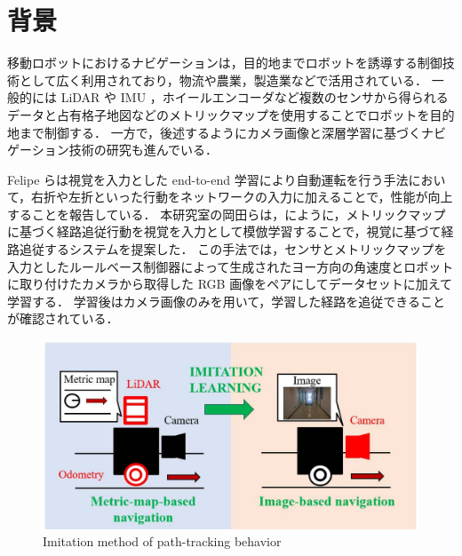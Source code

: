 
\section{背景}
移動ロボットにおけるナビゲーションは，目的地までロボットを誘導する制御技術として広く利用されており，物流や農業，製造業などで活用されている．
一般的には LiDAR や IMU ，ホイールエンコーダなど複数のセンサから得られるデータと占有格子地図などのメトリックマップを使用することでロボットを目的地まで制御する．
一方で，後述するようにカメラ画像と深層学習に基づくナビゲーション技術の研究も進んでいる．

Felipe ら\cite{codevilla2018endtoend}は視覚を入力とした end-to-end 学習により自動運転を行う手法において，右折や左折といった行動をネットワークの入力に加えることで，性能が向上することを報告している．
本研究室の岡田ら\cite{okada2020}\cite{okada2021}は，にように，メトリックマップに基づく経路追従行動を視覚を入力として模倣学習することで，視覚に基づて経路追従するシステムを提案した．
この手法では，センサとメトリックマップを入力としたルールベース制御器によって生成されたヨー方向の角速度とロボットに取り付けたカメラから取得した RGB 画像をペアにしてデータセットに加えて学習する．
学習後はカメラ画像のみを用いて，学習した経路を追従できることが確認されている．
\begin{figure}[h]
     \centering
     \includegraphics[width=120mm]{images/pdf/ishiguro/system.pdf}
     \caption{Imitation method of path-tracking behavior}
     \label{fig:imitation_sys}
\end{figure}

